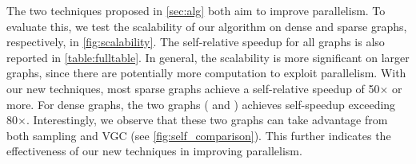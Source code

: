 The two techniques proposed in \cref{sec:alg} both aim to improve parallelism. 
To evaluate this, we test the scalability of our algorithm on dense and sparse graphs, respectively, in \cref{fig:scalability}. 
The self-relative speedup for all graphs is also reported in \cref{table:fulltable}. 
In general, the scalability is more significant on larger graphs, 
since there are potentially more computation to exploit parallelism. 
With our new techniques, most sparse graphs achieve a self-relative speedup of 50$\times$ or more. 
For dense graphs, the two graphs (\CW{} and \HL{}) achieves self-speedup exceeding 80$\times$. 
Interestingly, we observe that these two graphs can take advantage from both sampling and VGC (see \cref{fig:self_comparison}). 
This further indicates the effectiveness of our new techniques in improving parallelism. 


